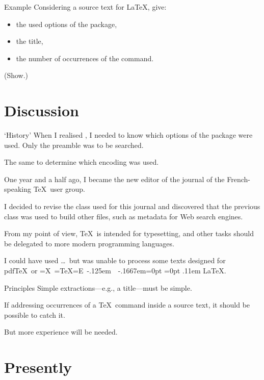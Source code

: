 \documentclass[pdf]{beamer}
\newcommand{\Dash}{---}
\DeclareRobustCommand{\Xe}{\leavevmode
 \tubhideheight{\hbox{X%
   \setbox0=\hbox{\TeX}\setbox1=\hbox{E}%
   \lower\dp0\hbox{\raise\dp1\hbox{\kern\XekernbeforeE\tubreflect{E}}}%
   \kern\XekernafterE}}}
\def\tubhideheight#1{\setbox0=\hbox{#1}\ht0=0pt \dp0=0pt \box0 }
\def\tubreflect#1{%
 \ifdim\fontdimen1\font>0pt%
   \raise1.75ex\hbox{\kern.1em\rotatebox{180}{#1}}\kern-.1em%
  \else\scalebox{-1}[1]{#1}%
 \fi}
\def\XekernafterE{-.1667em}
\def\XekernbeforeE{-.125em}
\def\XeLaTeX{\Xe{\kern.11em \LaTeX}}
\begin{document}
\begin{frame}{Example}
Considering a source text for \LaTeX, give:
\begin{itemize}
 \item the used options of the  package,
 \item the title,
 \item the number of occurrences of the  command.
\end{itemize}

(Show.)
\end{frame}

\section{Discussion}

\begin{frame}{`History'}
When I realised \mlBibTeX, I needed to know which options of the
 package were used. Only the preamble was to be
searched.\pause

The same to determine which encoding was used.\pause

One year and a half ago, I became the new editor of the journal of the
French-speaking \TeX\ user group.\pause

I decided to revise the class used for this journal and discovered that the
previous class was used to build other files, such as metadata for Web search
engines.\pause

From my point of view, \TeX\ is intended for typesetting, and other tasks
should be delegated to more modern programming languages.\pause

I could have used \ldots\pause\ but  was unable to
process some texts designed for pdf\TeX\ or \XeLaTeX.
\end{frame}

\begin{frame}{Principles}
Simple extractions\Dash e.g., a title\Dash must be simple.\pause

If addressing occurrences of a \TeX\ command inside a source text, it should be
possible to catch it.\pause

But more experience will be needed.
\end{frame}

\section{Presently}
\end{document}
